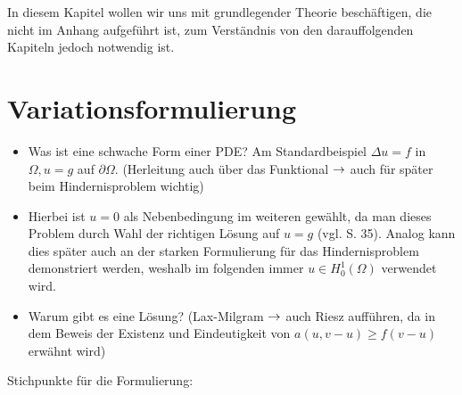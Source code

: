 \label{sec:Grundlagen}

In diesem Kapitel wollen wir uns mit grundlegender Theorie beschäftigen, die nicht im Anhang aufgeführt ist, zum Verständnis von den darauffolgenden Kapiteln jedoch notwendig ist.

\section{Variationsformulierung}

\begin{itemize}
\item Was ist eine schwache Form einer PDE? Am Standardbeispiel $\Delta u = f$ in $\Omega, u = g$ auf $\partial \Omega$. (Herleitung auch über das Funktional $\rightarrow$ auch für später beim Hindernisproblem wichtig)
\item Hierbei ist $u = 0$ als Nebenbedingung im weiteren gewählt, da man dieses Problem durch Wahl der richtigen Lösung auf $u = g$ (vgl. \cite{BraeFEM} S. 35). Analog kann dies später auch an der starken Formulierung für das Hindernisproblem demonstriert werden, weshalb im folgenden immer $u \in H^1_0(\Omega)$ verwendet wird.
\item Warum gibt es eine Lösung? (Lax-Milgram $\rightarrow$ auch Riesz aufführen, da in dem Beweis der Existenz und Eindeutigkeit von $a(u,v-u)\ge f(v-u)$ erwähnt wird)
\end{itemize}

Stichpunkte für die Formulierung:


